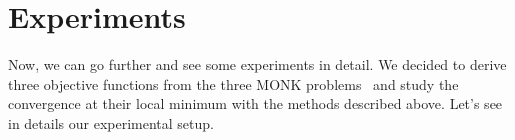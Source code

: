 \documentclass[11pt]{article}
\newtheorem{theorem}{Theorem}[section]
\newtheorem{assumption}[theorem]{Assumption}
\newcommand{\cgv}[1]{{\textcolor{RedOrange}[\textcolor{RedOrange}{\bf{GV: }}{ \textcolor{RedOrange}
              {#1}\textcolor{RedOrange}]}}}
\begin{document}

\section{Experiments}\label{sec:experiment}
Now, we can go further and see some experiments in detail. We decided to derive three objective functions from the three MONK problems~\cite{Dua:2019} and study the convergence at their local minimum with the methods described above.  Let's see in details our experimental setup.\\
\end{document}
